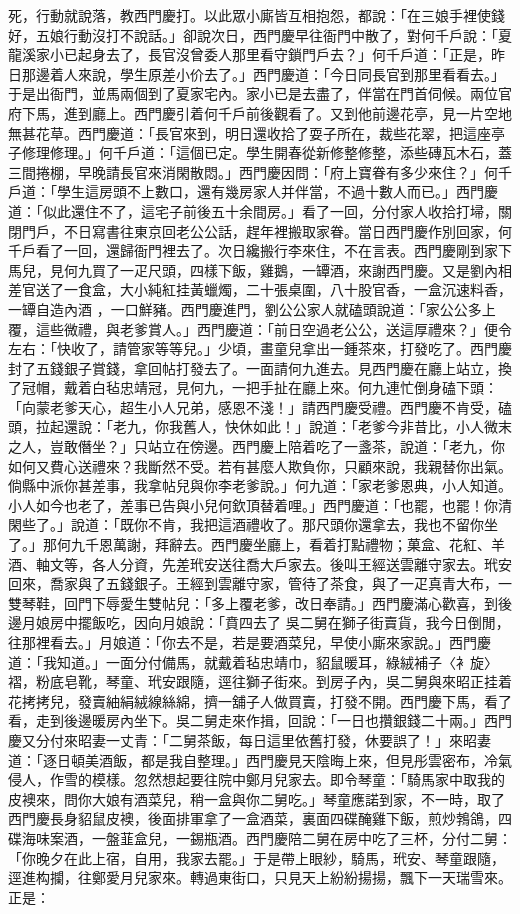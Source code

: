 死，行動就說落，教西門慶打。以此眾小廝皆互相抱怨，都說：「在三娘手裡使錢好，五娘行動沒打不說話。」卻說次日，西門慶早往衙門中散了，對何千戶說：「夏龍溪家小已起身去了，長官沒曾委人那里看守鎖門戶去？」何千戶道：「正是，昨日那邊着人來說，學生原差小价去了。」西門慶道：「今日同長官到那里看看去。」于是出衙門，並馬兩個到了夏家宅內。家小已是去盡了，伴當在門首伺候。兩位官府下馬，進到廳上。西門慶引着何千戶前後觀看了。又到他前邊花亭，見一片空地無甚花草。西門慶道：「長官來到，明日還收拾了耍子所在，裁些花翠，把這座亭子修理修理。」何千戶道：「這個已定。學生開春從新修整修整，添些磚瓦木石，蓋三間捲棚，早晚請長官來消閑散悶。」西門慶因問：「府上寶眷有多少來住？」何千戶道：「學生這房頭不上數口，還有幾房家人并伴當，不過十數人而已。」西門慶道：「似此還住不了，這宅子前後五十余間房。」看了一回，分付家人收拾打埽，關閉門戶，不日寫書往東京回老公公話，趕年裡搬取家眷。當日西門慶作別回家，何千戶看了一回，還歸衙門裡去了。次日纔搬行李來住，不在言表。西門慶剛到家下馬兒，見何九買了一疋尺頭，四樣下飯，雞鵝，一罈酒，來謝西門慶。又是劉內相差官送了一食盒，大小純紅挂黃蠟燭，二十張桌圍，八十股官香，一盒沉速料香，一罈自造內酒 ，一口鮮豬。西門慶進門，劉公公家人就磕頭說道：「家公公多上覆，這些微禮，與老爹賞人。」西門慶道：「前日空過老公公，送這厚禮來？」便令左右：「快收了，請管家等等兒。」少頃，畫童兒拿出一鍾茶來，打發吃了。西門慶封了五錢銀子賞錢，拿回帖打發去了。一面請何九進去。見西門慶在廳上站立，換了冠帽，戴着白毡忠靖冠，見何九，一把手扯在廳上來。何九連忙倒身磕下頭：「向蒙老爹天心，超生小人兄弟，感恩不淺！」請西門慶受禮。西門慶不肯受，磕頭，拉起還說：「老九，你我舊人，快休如此！」說道：「老爹今非昔比，小人微末之人，豈敢僭坐？」只站立在傍邊。西門慶上陪着吃了一盞茶，說道：「老九，你如何又費心送禮來？我斷然不受。若有甚麼人欺負你，只顧來說，我親替你出氣。倘縣中派你甚差事，我拿帖兒與你李老爹說。」何九道：「家老爹恩典，小人知道。小人如今也老了，差事已告與小兒何欽頂替着哩。」西門慶道：「也罷，也罷！你清閑些了。」說道：「既你不肯，我把這酒禮收了。那尺頭你還拿去，我也不留你坐了。」那何九千恩萬謝，拜辭去。西門慶坐廳上，看着打點禮物；菓盒、花紅、羊酒、軸文等，各人分資，先差玳安送往喬大戶家去。後叫王經送雲離守家去。玳安回來，喬家與了五錢銀子。王經到雲離守家，管待了茶食，與了一疋真青大布，一雙琴鞋，回門下辱愛生雙帖兒：「多上覆老爹，改日奉請。」西門慶滿心歡喜，到後邊月娘房中擺飯吃，因向月娘說：「賁四去了 吳二舅在獅子街賣貨，我今日倒閒，往那裡看去。」月娘道：「你去不是，若是要酒菜兒，早使小廝來家說。」西門慶道：「我知道。」一面分付備馬，就戴着毡忠靖巾，貂鼠暖耳，綠絨補子〈衤旋〉褶，粉底皂靴，琴童、玳安跟隨，逕往獅子街來。到房子內，吳二舅與來昭正挂着花拷拷兒，發賣紬絹絨線絲綿，擠一舖子人做買賣，打發不開。西門慶下馬，看了看，走到後邊暖房內坐下。吳二舅走來作揖，回說：「一日也攢銀錢二十兩。」西門慶又分付來昭妻一丈青：「二舅茶飯，每日這里依舊打發，休要誤了！」來昭妻道：「逐日頓美酒飯，都是我自整理。」西門慶見天陰晦上來，但見彤雲密布，冷氣侵人，作雪的模樣。忽然想起要往院中鄭月兒家去。即令琴童：「騎馬家中取我的皮襖來，問你大娘有酒菜兒，稍一盒與你二舅吃。」琴童應諾到家，不一時，取了西門慶長身貂鼠皮襖，後面排軍拿了一盒酒菜，裏面四碟醃雞下飯，煎炒鵓鴿，四碟海味案酒，一盤韮盒兒，一錫瓶酒。西門慶陪二舅在房中吃了三杯，分付二舅：「你晚夕在此上宿，自用，我家去罷。」于是帶上眼紗，騎馬，玳安、琴童跟隨，逕進构攔，往鄭愛月兒家來。轉過東街口，只見天上紛紛揚揚，飄下一天瑞雪來。正是：

